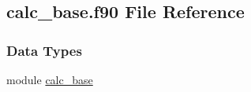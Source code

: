 \hypertarget{calc__base_8f90}{\subsection{calc\-\_\-base.\-f90 File Reference}
\label{calc__base_8f90}
}
\subsubsection*{Data Types}
\begin{DoxyCompactItemize}
\item 
module \hyperlink{classcalc__base}{calc\-\_\-base}
\end{DoxyCompactItemize}

